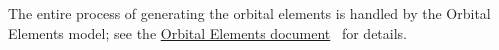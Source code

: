 %
%
% 
%


The entire process of generating the orbital elements is handled by the Orbital Elements model; see the 
\href{file:\JEODHOME/models/utils/orbital_elements/docs/orbital_elements.pdf}{Orbital Elements document}~\cite{dynenv:ORBITALELEMENTS} for details.

